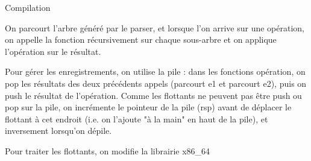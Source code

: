 \documentclass{article}
\theoremstyle{definition}
\begin{document}
\begin{section}{Compilation}

On parcourt l'arbre généré par le parser, et lorsque l'on arrive sur une opération, on appelle la fonction récursivement sur chaque sous-arbre et on applique l'opération sur le résultat.

Pour gérer les enregistrements, on utilise la pile : dans les fonctions opération, on pop les résultats des deux précédents appels (parcourt e1 et parcourt e2), puis on push le résultat de l'opération. 
Comme les flottants ne peuvent pas être push ou pop sur la pile, on incrémente le pointeur de la pile (rsp) avant de déplacer le flottant à cet endroit (i.e. on l'ajoute "à la main" en haut de la pile), et inversement lorsqu'on dépile.

Pour traiter les flottants, on modifie la librairie x86_64 

\end{section}
\end{document}

